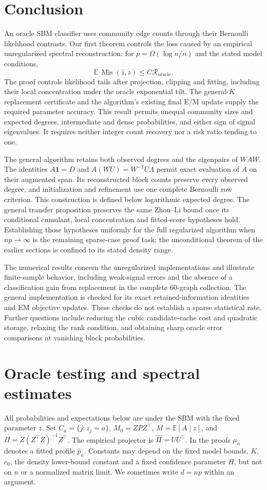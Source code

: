 \documentclass[11pt]{article}
\theoremstyle{definition}
\theoremstyle{remark}
\newcommand{\Mis}{\operatorname{Mis}}
\newcommand{\E}{\mathbb E}
\newcommand{\Roracle}{\mathcal R_{\mathrm{oracle}}}
\numberwithin{equation}{section}
\begin{document}
\section{Conclusion}
\label{sec:conclusion}

An oracle SBM classifier uses community edge counts through their Bernoulli likelihood contrasts. Our first theorem controls the loss caused by an empirical unregularized spectral reconstruction: for $p=\Omega(\log n/n)$ and the stated model conditions,
\[
 \mathbb E\,\Mis(\widehat z,z)\le C\Roracle.
\]
The proof controls likelihood tails after projection, clipping and fitting, including their local concentration under the oracle exponential tilt. The general-$K$ replacement certificate and the algorithm's existing final E/M update supply the required parameter accuracy. This result permits unequal community sizes and expected degrees, intermediate and dense probabilities, and either sign of signal eigenvalues. It requires neither integer count recovery nor a risk ratio tending to one.

The general algorithm retains both observed degrees and the eigenpairs of $WAW$. The identities $A\mathbf1=D$ and $A(WU)=W^{-1}U\Lambda$ permit exact evaluation of $A$ on their augmented span. Its reconstructed block counts preserve every observed degree, and initialization and refinement use one complete Bernoulli row criterion. This construction is defined below logarithmic expected degree. The general transfer proposition preserves the same Zhou--Li bound once its conditional cumulant, local concentration and fitted-score hypotheses hold. Establishing those hypotheses uniformly for the full regularized algorithm when $np\to\infty$ is the remaining sparse-case proof task; the unconditional theorem of the earlier sections is confined to its stated density range.

The numerical results concern the unregularized implementations and illustrate finite-sample behavior, including weak-signal errors and the absence of a classification gain from replacement in the complete 60-graph collection. The general implementation is checked for its exact retained-information identities and EM objective updates. These checks do not establish a sparse statistical rate. Further questions include reducing the cubic candidate-cache cost and quadratic storage, relaxing the rank condition, and obtaining sharp oracle error comparisons at vanishing block probabilities.

\appendix
\section{Oracle testing and spectral estimates}
\label{app:statistical-proofs}
All probabilities and expectations below are under the SBM with the fixed parameter $z$. Set $C_a=\{j:z_j=a\}$, $M_0=ZPZ^\top$, $M=\E[A\mid z]$, and $\Pi=Z(Z^\top Z)^{-1}Z^\top$. The empirical projector is $\widehat\Pi=UU^\top$. In the proofs $\mu_a$ denotes a fitted profile $\widehat p_a$. Constants may depend on the fixed model bounds, $K$, $c_0$, the density lower-bound constant and a fixed confidence parameter $H$, but not on $n$ or a normalized matrix limit. We sometimes write $d=np$ within an argument.
\end{document}
